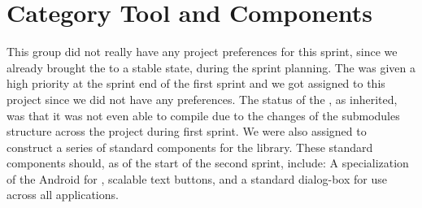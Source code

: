 \section{Category Tool and Components}

This group did not really have any project preferences for this sprint, since we already brought the \launcher to a stable state, during the sprint planning. The \giraf \ct was given a high priority at the sprint end of the first sprint and we got assigned to this project since we did not have any preferences. The status of the \ct, as inherited, was that it was not even able to compile due to the changes of the submodules structure across the project during first sprint. We were also assigned to construct a series of standard components for the  library. These standard components should, as of the start of the second sprint, include: A specialization of the Android  for \giraf, scalable text buttons, and a standard dialog-box for use across all applications. 
